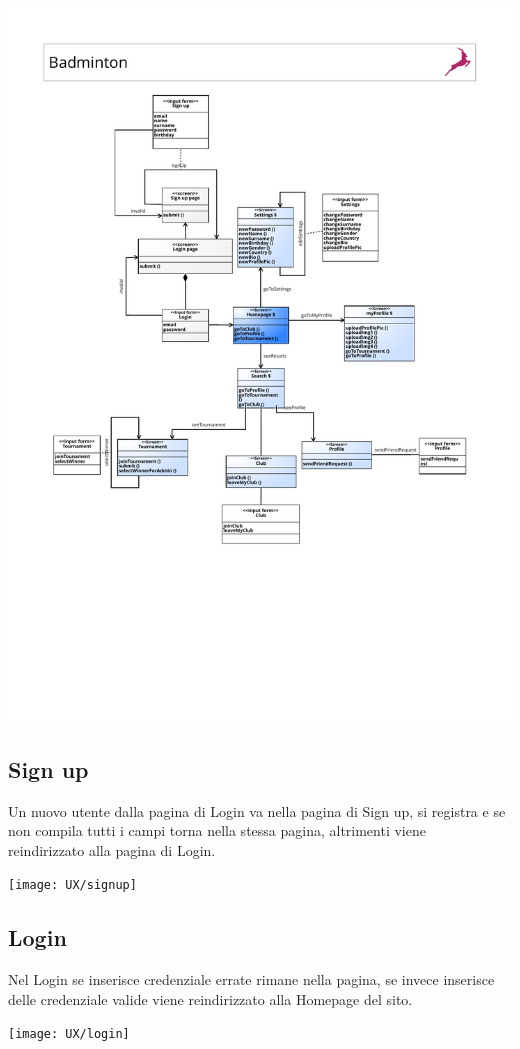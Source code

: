 \documentclass{article}
\begin{document}
    \begin{center}
        \includegraphics[width=18cm]{UX/BadmintonUX}
    \end{center}
    \subsection{Sign up}
Un nuovo utente dalla pagina di Login va nella pagina di Sign up, si registra e se non compila tutti i campi torna nella stessa pagina, altrimenti viene\\ reindirizzato alla pagina di Login. \\
\begin{center}
    \texttt{[image: UX/signup]}
\end{center}
\subsection{Login}
Nel Login se inserisce credenziale errate rimane nella pagina, se invece inserisce delle credenziale valide viene reindirizzato alla Homepage del sito.\\
\begin{center}
    \texttt{[image: UX/login]}
\end{center}
\end{document}
